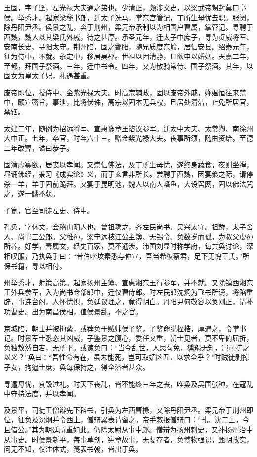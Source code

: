 \documentclass[]{article}
\begin{document}
王固，字子坚，左光禄大夫通之弟也。少清正，颇涉文史，以梁武帝甥封莫口亭侯。举秀才。起家梁秘书郎，迁太子洗马，掌东宫管记，丁所生母忧去职。服阕，除丹阳尹丞。侯景之乱，奔于荆州，梁元帝承制以为相国户曹属，掌管记。寻聘于西魏，魏人以其梁氏外戚，待之甚厚。承圣元年，迁太子中庶子，寻为贞威将军、安南长史、寻阳太守。荆州陷，固之鄱阳，随兄质度东岭，居信安县。绍泰元年，征为侍中，不就。永定中，移居吴郡。世祖以固清静，且欲申以婚姻。天嘉二年，至都，拜国子祭酒。三年，迁中书令。四年，又为散骑常侍、国子祭酒。其年，以固女为皇太子妃，礼遇甚重。

废帝即位，授侍中、金紫光禄大夫。时高宗辅政，固以废帝外戚，妳媪恒往来禁中，颇宣密旨，事泄，比将伏诛，高宗以固本无兵权，且居处清洁，止免所居官，禁锢。

太建二年，随例为招远将军、宣惠豫章王谘议参军。迁太中大夫、太常卿、南徐州大中正。七年，卒官，时年六十三。赠金紫光禄大夫。丧事所须，随由资给。至德二年改葬，谥曰恭子。

固清虚寡欲，居丧以孝闻。又崇信佛法，及丁所生母忧，遂终身蔬食，夜则坐禅，昼诵佛经，兼习《成实论》义，而于玄言非所长。尝聘于西魏，因宴飨之际，请停杀一羊，羊于固前跪拜。又宴于昆明池，魏人以南人嗜鱼，大设罟网，固以佛法咒之，遂一鳞不获。

子宽，官至司徒左史、侍中。

孔奂，字休文，会稽山阴人也。曾祖琇之，齐左民尚书、吴兴太守。祖臶，太子舍人、尚书三公郎。父稚孙，梁宁远枝江公主簿、无锡令。奂数岁而孤，为叔父虔孙所养。好学，善属文，经史百家，莫不通涉。沛国刘显时称学府，每共奂讨论，深相叹服，乃执奂手曰：``昔伯喈坟素悉与仲宣，吾当希彼蔡君，足下无愧王氏。''所保书籍，寻以相付。

州举秀才，射策高第。起家扬州主簿、宣惠湘东王行参军，并不就。又除镇西湘东王外兵参军，入为尚书仓部郎中，迁仪曹侍郎。时左民郎沈炯为飞书所谤，将陷重辟，事连台阁，人怀忧惧，奂廷议理之，竟得明白。丹阳尹何敬容以奂刚正，请补功曹史。出为南昌侯相，值侯景乱，不之官。

京城陷，朝士并被拘絷，或荐奂于贼帅侯子鉴，子鉴命脱桎梏，厚遇之，令掌书记。时景军士悉恣其凶威，子鉴景之腹心，委任又重，朝士见者，莫不卑俯屈折，奂独敖然自若，无所下。或谏奂曰：``当今乱世，人思苟免，獯羯无知，岂可抗之以义？''奂曰：``吾性命有在，虽未能死，岂可取媚凶丑，以求全乎？''时贼徒剥掠子女，拘逼士庶，奂每保持之，得全济者甚众。

寻遭母忧，哀毁过礼。时天下丧乱，皆不能终三年之丧，唯奂及吴国张种，在寇乱中守持法度，并以孝闻。

及景平，司徒王僧辩先下辟书，引奂为左西曹掾，又除丹阳尹丞。梁元帝于荆州即位，征奂及沈炯并令西上，僧辩累表请留之。帝手敕报僧辩曰：``孔、沈二士，今且借公。''其为朝廷所重如此。仍除太尉从事中郎。僧辩为扬州刺史，又补扬州治中从事史。时侯景新平，每事草创，宪章故事，无复存者，奂博物强识，甄明故实，问无不知，仪注体式，笺表书翰，皆出于奂。
\end{document}

